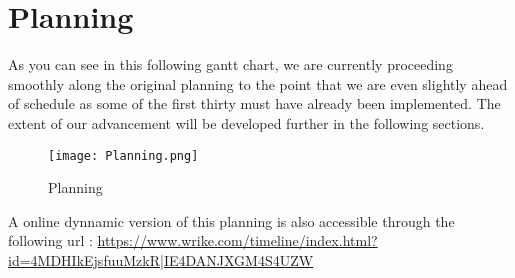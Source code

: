 \section{Planning}

As you can see in this following gantt chart, we are currently proceeding smoothly along the original planning to the point that we are even slightly ahead of schedule as some of the first thirty must have already been implemented. The extent of our advancement will be developed further in the following sections. \newline

\begin{figure}[H]
	\centering
	\texttt{[image: Planning.png]}
	\caption{Planning}
	\label{fig:length_eight_mouse}
\end{figure}

A online dynnamic version of this planning is also accessible through the following url :
\url{https://www.wrike.com/timeline/index.html?id=4MDHIkEjsfuuMzkR|IE4DANJXGM4S4UZW}

